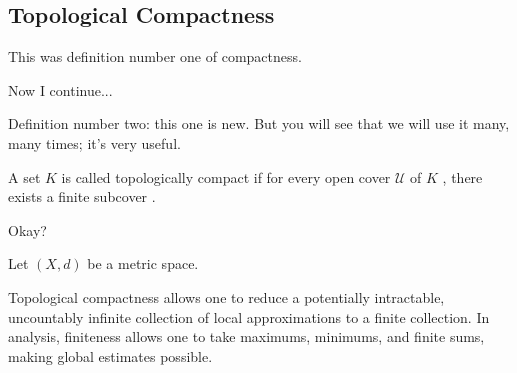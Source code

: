 \begin{hidden}
\end{hidden}

\subsection{Topological Compactness}

\begin{speech}[00:59:57 - 01:01:19]
This was definition number one of compactness.

Now I continue... 

Definition number two: this one is new. But you will see that we will use it many, many times; it's very useful.

A set $K$ is called topologically compact if for every open cover $\mathcal{U}$ of $K$ , there exists a finite subcover . 

Okay?
\end{speech}

\begin{content}
Let $(X, d)$ be a metric space.


\begin{steps}
Topological compactness allows one to reduce a potentially intractable, uncountably infinite collection of local approximations to a finite collection. In analysis, finiteness allows one to take maximums, minimums, and finite sums, making global estimates possible.
\end{steps}
\end{content}

